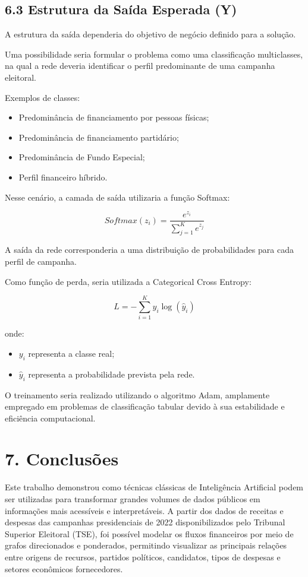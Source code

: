 \documentclass[11pt]{article}
\providecommand{\tightlist}{%
      \setlength{\itemsep}{0pt}\setlength{\parskip}{0pt}}
\begin{document}
\subsection{6.3 Estrutura da Saída Esperada
(Y)}\label{estrutura-da-sauxedda-esperada-y}

A estrutura da saída dependeria do objetivo de negócio definido para a
solução.

Uma possibilidade seria formular o problema como uma classificação
multiclasses, na qual a rede deveria identificar o perfil predominante
de uma campanha eleitoral.

Exemplos de classes:

\begin{itemize}
\tightlist
\item
  Predominância de financiamento por pessoas físicas;
\item
  Predominância de financiamento partidário;
\item
  Predominância de Fundo Especial;
\item
  Perfil financeiro híbrido.
\end{itemize}

Nesse cenário, a camada de saída utilizaria a função Softmax:

\[
Softmax(z_i)=\frac{e^{z_i}}{\sum_{j=1}^{K} e^{z_j}}
\]

A saída da rede corresponderia a uma distribuição de probabilidades para
cada perfil de campanha.

Como função de perda, seria utilizada a Categorical Cross Entropy:

\[
L=-\sum_{i=1}^{K} y_i\log(\hat{y}_i)
\]

onde:

\begin{itemize}
\tightlist
\item
  \(y_i\) representa a classe real;
\item
  \(\hat{y}_i\) representa a probabilidade prevista pela rede.
\end{itemize}

O treinamento seria realizado utilizando o algoritmo Adam, amplamente
empregado em problemas de classificação tabular devido à sua
estabilidade e eficiência computacional.

    \section{7. Conclusões}\label{conclusuxf5es}

Este trabalho demonstrou como técnicas clássicas de Inteligência
Artificial podem ser utilizadas para transformar grandes volumes de
dados públicos em informações mais acessíveis e interpretáveis. A partir
dos dados de receitas e despesas das campanhas presidenciais de 2022
disponibilizados pelo Tribunal Superior Eleitoral (TSE), foi possível
modelar os fluxos financeiros por meio de grafos direcionados e
ponderados, permitindo visualizar as principais relações entre origens
de recursos, partidos políticos, candidatos, tipos de despesas e setores
econômicos fornecedores.
\end{document}
